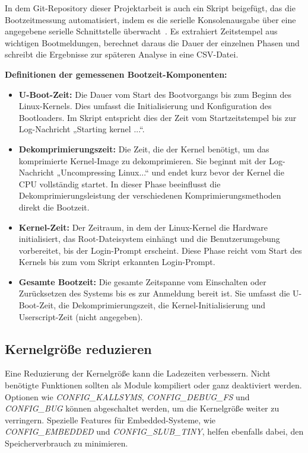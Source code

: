 In dem Git-Repository dieser Projektarbeit is auch ein Skript beigefügt, das die Bootzeitmessung
automatisiert, indem es die serielle Konsolenausgabe über eine angegebene serielle Schnittstelle
überwacht~\cite{myBootMeasureScript}. Es extrahiert Zeitstempel aus wichtigen Bootmeldungen, berechnet daraus
die Dauer der einzelnen Phasen und schreibt die Ergebnisse zur späteren Analyse in eine CSV-Datei.


\textbf{Definitionen der gemessenen Bootzeit-Komponenten:}
\begin{itemize}
	\item \textbf{U-Boot-Zeit:} Die Dauer vom Start des Bootvorgangs bis zum Beginn des Linux-Kernels. Dies
	      umfasst die Initialisierung und Konfiguration des Bootloaders. Im Skript entspricht dies der Zeit vom
	      Startzeitstempel bis zur Log-Nachricht „Starting kernel ...“.
	\item \textbf{Dekomprimierungszeit:} Die Zeit, die der Kernel benötigt, um das komprimierte Kernel-Image zu
	      dekomprimieren. Sie beginnt mit der Log-Nachricht „Uncompressing Linux...“ und endet kurz bevor der Kernel
	      die CPU vollständig startet. In dieser Phase beeinflusst die Dekomprimierungsleistung der verschiedenen
	      Komprimierungsmethoden direkt die Bootzeit.
	\item \textbf{Kernel-Zeit:} Der Zeitraum, in dem der Linux-Kernel die Hardware initialisiert, das
	      Root-Dateisystem einhängt und die Benutzerumgebung vorbereitet, bis der Login-Prompt erscheint. Diese
	      Phase reicht vom Start des Kernels bis zum vom Skript erkannten Login-Prompt.
	\item \textbf{Gesamte Bootzeit:} Die gesamte Zeitspanne vom Einschalten oder Zurücksetzen des Systems bis es
	      zur Anmeldung bereit ist. Sie umfasst die U-Boot-Zeit, die Dekomprimierungszeit, die
	      Kernel-Initialisierung und Userscript-Zeit (nicht angegeben).
\end{itemize}

\subsection{Kernelgröße reduzieren}
Eine Reduzierung der Kernelgröße kann die Ladezeiten verbessern. Nicht benötigte Funktionen sollten als Module
kompiliert oder ganz deaktiviert werden. Optionen wie \textit{CONFIG\_KALLSYMS}, \textit{CONFIG\_DEBUG\_FS}
und \textit{CONFIG\_BUG} können abgeschaltet werden, um die Kernelgröße weiter zu verringern. Spezielle
Features für Embedded-Systeme, wie \textit{CONFIG\_EMBEDDED} und \textit{CONFIG\_SLUB\_TINY}, helfen ebenfalls
dabei, den Speicherverbrauch zu minimieren.

